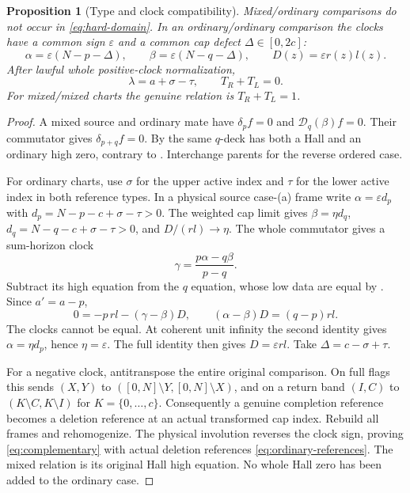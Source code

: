 \documentclass[11pt,a4paper]{amsart}
\numberwithin{equation}{section}
\theoremstyle{plain}
\newtheorem{proposition}[theorem]{Proposition}
\theoremstyle{definition}
\newcommand{\DD}{\mathscr D}
\newcommand{\eps}{\varepsilon}
\begin{document}
\begin{proposition}[Type and clock compatibility]\label{prop:clocks}
Mixed/ordinary comparisons do not occur in \eqref{eq:hard-domain}.  In an ordinary/ordinary comparison the clocks have a common sign \(\eps\) and a common cap defect \(\Delta\in[0,2c]\):
\[
 \alpha=\eps(N-p-\Delta),\qquad
 \beta=\eps(N-q-\Delta),\qquad D(z)=\eps r(z)l(z).
\]
After lawful whole positive-clock normalization,
\begin{equation}\label{eq:complementary}
 \lambda=a+\sigma-\tau,\qquad T_R+T_L=0.
\end{equation}
For mixed/mixed charts the genuine relation is \(T_R+T_L=1\).
\end{proposition}
\begin{proof}
A mixed source and ordinary mate have \(\delta_pf=0\) and \(\DD_q(\beta)f=0\).  Their commutator gives \(\delta_{p+q}f=0\).  By  the same \(q\)-deck has both a Hall and an ordinary high zero, contrary to .  Interchange parents for the reverse ordered case.

For ordinary charts, use \(\sigma\) for the upper active index and \(\tau\) for the lower active index in both reference types.  In a physical source case-(a) frame write \(\alpha=\eps d_p\) with \(d_p=N-p-c+\sigma-\tau>0\).  The weighted cap limit gives \(\beta=\eta d_q\), \(d_q=N-q-c+\sigma-\tau>0\), and \(D/(rl)\to\eta\).  The whole commutator gives a sum-horizon clock
\[
 \gamma=\frac{p\alpha-q\beta}{p-q}.
\]
Subtract its high equation from the \(q\) equation, whose low data are equal by .  Since \(a'=a-p\),
\[
 0=-p\,rl-(\gamma-\beta)D,
 \qquad (\alpha-\beta)D=(q-p)rl.
\]
The clocks cannot be equal.  At coherent unit infinity the second identity gives \(\alpha=\eta d_p\), hence \(\eta=\eps\).  The full identity then gives \(D=\eps rl\).  Take \(\Delta=c-\sigma+\tau\).

For a negative clock, antitranspose the entire original comparison.  On full flags this sends \((X,Y)\) to \(([0,N]\setminus Y,[0,N]\setminus X)\), and on a return band \((I,C)\) to \((K\setminus C,K\setminus I)\) for \(K=\{0,\ldots,c\}\).  Consequently a genuine completion reference becomes a deletion reference at an actual transformed cap index.  Rebuild all frames and rehomogenize.  The physical involution reverses the clock sign, proving \eqref{eq:complementary} with actual deletion references \eqref{eq:ordinary-references}.  The mixed relation is its original Hall high equation.  No whole Hall zero has been added to the ordinary case.
\end{proof}
\end{document}
